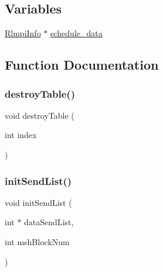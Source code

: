 \subsection*{Variables}
\begin{DoxyCompactItemize}
\item 
\mbox{\hyperlink{structRlmpiInfo}{Rlmpi\+Info}} $\ast$ \mbox{\hyperlink{include_2register_8H_a67febbff53bf6fe81c504cad6803fca8}{schedule\+\_\+data}}
\end{DoxyCompactItemize}


\subsection{Function Documentation}
\mbox{\label{include_2register_8H_a099f07ebad307cc1509766f32cfcba5f}} 
\subsubsection{\texorpdfstring{destroyTable()}{destroyTable()}}
{\footnotesize\ttfamily void destroy\+Table (\begin{DoxyParamCaption}\item[{int}]{index }\end{DoxyParamCaption})}

\mbox{\label{include_2register_8H_a4e113cf30f6198d50fb212074effcc61}} 
\subsubsection{\texorpdfstring{initSendList()}{initSendList()}\hspace{0.1cm}{\footnotesize\ttfamily [1/2]}}
{\footnotesize\ttfamily void init\+Send\+List (\begin{DoxyParamCaption}\item[{int $\ast$}]{data\+Send\+List,  }\item[{int}]{msh\+Block\+Num }\end{DoxyParamCaption})}

\mbox{\label{include_2register_8H_ace23239002b4fdf135d4ad20ae2df6e7}} 
